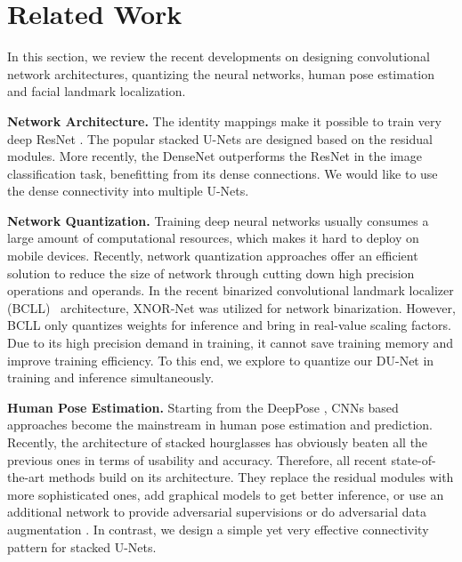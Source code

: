 \section{Related Work}
In this section, we review the recent developments on designing convolutional network architectures, quantizing the neural networks, human pose estimation and facial landmark localization.

{\bf Network Architecture.}
The identity mappings make it possible to train very deep ResNet \cite{he2016deep}. The popular stacked U-Nets \cite{newell2016stacked} are designed based on the residual modules. More recently, the DenseNet \cite{huang2016densely} outperforms the ResNet in the image classification task, benefitting from its dense connections. We would like to use the dense connectivity into multiple U-Nets.


{\bf Network Quantization.}
Training deep neural networks usually consumes a large amount of computational resources, which makes it hard to deploy on mobile devices. Recently, network quantization approaches \cite{courbariaux2016binarized,li2016ternary,zhou2016dorefa,wu2018training,rastegari2016xnor} offer an efficient solution to reduce the size of network through cutting down high precision operations and operands. In the recent binarized convolutional landmark localizer (BCLL)~\cite{bulat2017binarized} architecture, XNOR-Net \cite{rastegari2016xnor} was utilized for network binarization. However, BCLL only quantizes weights for inference and bring in real-value scaling factors. Due to its high precision demand in training, it cannot save training memory and improve training efficiency. To this end, we explore to quantize our DU-Net in training and inference simultaneously.

{\bf Human Pose Estimation.}
Starting from the DeepPose \cite{toshev2014deeppose}, CNNs based approaches \cite{wei2016convolutional,carreira2016human,bulat2016human,pishchulin2016deepcut,insafutdinov2016deepercut,lifshitz2016human,belagiannis2017recurrent,zhao2018learning} become the mainstream in human pose estimation and prediction. Recently, the architecture of stacked hourglasses \cite{newell2016stacked} has obviously beaten all the previous ones in terms of usability and accuracy. Therefore, all recent state-of-the-art methods \cite{chu2017multi,yang2017learning,yu2017adversarial,peng2018jointly} build on its architecture. They replace the residual modules with more sophisticated ones, add graphical models to get better inference, or use an additional network to provide adversarial supervisions or do adversarial data augmentation \cite{peng2018jointly}. In contrast, we design a simple yet very effective connectivity pattern for stacked U-Nets.

